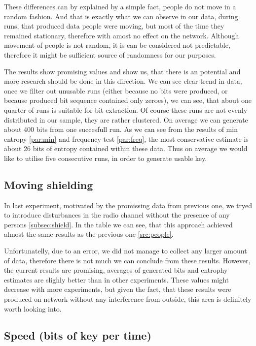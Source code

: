 \documentclass[
  print, %
  table,   %
  nolof,     %
  nolot,     %
           oneside
]{fithesis3}
\begin{document}
  These differences can by explained by a simple fact, people do not move in a random fashion. And that is exactly what we can observe in our data, during runs, that produced data people were moving, but most of the time they remained stationary, therefore with amost no effect on the network. Although movement of people is not random, it is can be considered not predictable, therefore it might be sufficient source of randomness for our purposes.

  The results show promising values and show us, that there is an potential and more research should be done in this direction. We can see clear trend in data, once we filter out unusable runs (either because no bits were produced, or because produced bit sequence contained only zeroes), we can see, that about one quarter of runs is suitable for bit extraction. Of course these runs are not evenly distributed in our sample, they are rather clustered. On average we can generate about 400 bits from one succesfull run. As we can see from the results of min entropy \ref{par:min} and frequency test \ref{par:freq}, the most conservative estimate is about 26 bits of entropy contained within these data. Thus on average we would like to utilise five consecutive runs, in order to generate usable key.

  \subsection{Moving shielding}\label{src:shield}
  In last experiment, motivated by the promissing data from previous one, we tryed to introduce disturbances in the radio channel without the presence of any persons \ref{subsec:shield}. In the table we can see, that this approach achieved almost the same results as the previous one \ref{src:people}.

  Unfortunatelly, due to an error, we did not manage to collect any larger amount of data, therefore there is not much we can conclude from these results. However, the current results are promising, averages of generated bits and entrophy estimates are slighly better than in other experiments.  These values might decrease with more experiments, but given the fact, that these results were produced on network without any interference from outside, this area is definitely worth looking into.

  \subsection{Speed (bits of key per time)}
  
\end{document}
